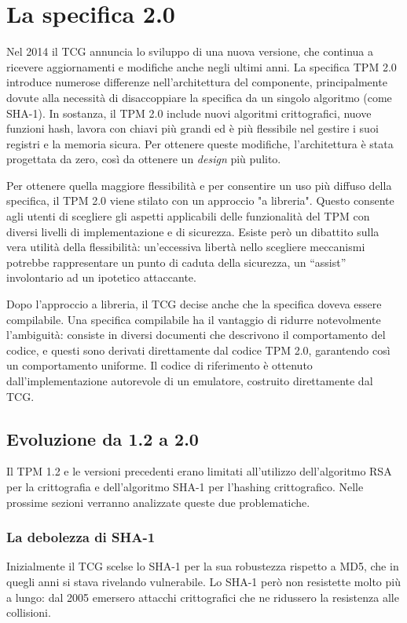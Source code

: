 \clearpage
\section{La specifica 2.0}
Nel 2014 il TCG annuncia lo sviluppo di una nuova versione, che continua a ricevere aggiornamenti e modifiche anche negli ultimi anni. La specifica TPM 2.0 introduce numerose differenze nell’architettura del componente, principalmente dovute alla necessità di disaccoppiare la specifica da un singolo algoritmo (come SHA-1). In sostanza, il TPM 2.0 include nuovi algoritmi crittografici, nuove funzioni hash, lavora con chiavi più grandi ed è più flessibile nel gestire i suoi registri e la memoria sicura. Per ottenere queste modifiche, l’architettura è stata progettata da zero, così da ottenere un \textit{design} più pulito. 

Per ottenere quella maggiore flessibilità e per consentire un uso più diffuso della specifica, il TPM 2.0 viene stilato con un approccio "a libreria". Questo consente agli utenti di scegliere gli aspetti applicabili delle funzionalità del TPM con diversi livelli di implementazione e di sicurezza. Esiste però un dibattito sulla vera utilità della flessibilità: un’eccessiva libertà nello scegliere meccanismi potrebbe rappresentare un punto di caduta della sicurezza, un “assist” involontario ad un ipotetico attaccante. 

Dopo l’approccio a libreria, il TCG decise anche che la specifica doveva essere compilabile. Una specifica compilabile ha il vantaggio di ridurre notevolmente l'ambiguità: consiste in diversi documenti che descrivono il comportamento del codice, e questi sono derivati direttamente dal codice TPM 2.0, garantendo così un comportamento uniforme. Il codice di riferimento è ottenuto dall’implementazione autorevole di un emulatore, costruito direttamente dal TCG.

\subsection{Evoluzione da 1.2 a 2.0}
Il TPM 1.2 e le versioni precedenti erano limitati all'utilizzo dell'algoritmo RSA per la crittografia e dell'algoritmo SHA-1 per l'hashing crittografico. Nelle prossime sezioni verranno analizzate queste due problematiche.

\subsubsection{La debolezza di SHA-1}
Inizialmente il TCG scelse lo SHA-1 per la sua robustezza rispetto a MD5, che in quegli anni si stava rivelando vulnerabile. Lo SHA-1 però non resistette molto più a lungo: dal 2005 emersero attacchi crittografici che ne ridussero la resistenza alle collisioni. 

